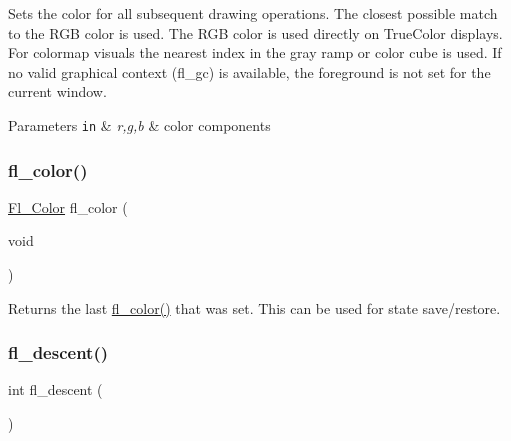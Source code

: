 Sets the color for all subsequent drawing operations. The closest possible match to the R\+GB color is used. The R\+GB color is used directly on True\+Color displays. For colormap visuals the nearest index in the gray ramp or color cube is used. If no valid graphical context (fl\+\_\+gc) is available, the foreground is not set for the current window. 
\begin{DoxyParams}[1]{Parameters}
\mbox{\tt in}  & {\em r,g,b} & color components \\
\hline
\end{DoxyParams}
\mbox{\label{group__fl__attributes_gaea8392e995de663b0d8063af199cf085}} 
\subsubsection{\texorpdfstring{fl\+\_\+color()}{fl\_color()}\hspace{0.1cm}{\footnotesize\ttfamily [4/4]}}
{\footnotesize\ttfamily \hyperlink{_enumerations_8_h_a8b762953646f8abee866061f1af78a6a}{Fl\+\_\+\+Color} fl\+\_\+color (\begin{DoxyParamCaption}\item[{void}]{ }\end{DoxyParamCaption})\hspace{0.3cm}{\ttfamily [inline]}}

Returns the last \hyperlink{group__fl__attributes_ga974e9f64959aa83cf6f0a36d3f0105aa}{fl\+\_\+color()} that was set. This can be used for state save/restore. \mbox{\label{group__fl__attributes_ga080e029f6b6fe5e6bf527bbfd890317d}} 
\subsubsection{\texorpdfstring{fl\+\_\+descent()}{fl\_descent()}}
{\footnotesize\ttfamily int fl\+\_\+descent (\begin{DoxyParamCaption}{ }\end{DoxyParamCaption})\hspace{0.3cm}{\ttfamily [inline]}}

